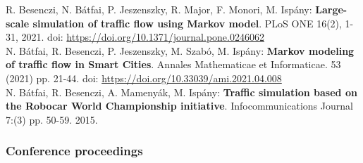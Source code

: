 \documentclass[b5paper,12pt]{report}
\theoremstyle{definition}
\begin{document}
\begin{singlespace}
\small
\noindent
R. Besenczi, N. Bátfai, P. Jeszenszky, R. Major, F. Monori, M. Ispány: {\bf{Large-scale simulation of traffic flow using Markov model}}. PLoS ONE 16(2), 1-31, 2021. doi: \url{https://doi.org/10.1371/journal.pone.0246062}
\\[10pt]
\noindent
N. Bátfai, R. Besenczi, P. Jeszenszky, M. Szabó, M. Ispány: {\bf{Markov modeling of traffic flow in Smart Cities}}. Annales Mathematicae et Informaticae. 53 (2021) pp. 21-44. doi: \url{https://doi.org/10.33039/ami.2021.04.008}
\\[10pt]
\noindent
N. Bátfai, R. Besenczi, A. Mamenyák, M. Ispány: {\bf{Traffic simulation based on the Robocar World Championship initiative}}. Infocommunications Journal 7:(3) pp. 50-59. 2015.

\subsubsection*{Conference proceedings}


\end{singlespace}
\end{document}
